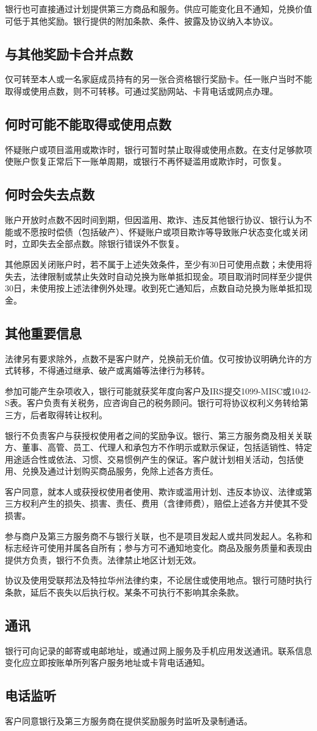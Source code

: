 \documentclass[UTF8,fontset=none,11pt,a4paper]{ctexart}
\begin{document}
银行也可直接通过计划提供第三方商品和服务。供应可能变化且不通知，兑换价值可低于其他奖励。银行提供的附加条款、条件、披露及协议纳入本协议。


\subsection*{与其他奖励卡合并点数}
仅可转至本人或一名家庭成员持有的另一张合资格银行奖励卡。任一账户当时不能取得或使用点数，则不可转移。可通过奖励网站、卡背电话或网点办理。


\subsection*{何时可能不能取得或使用点数}
怀疑账户或项目滥用或欺诈时，银行可暂时禁止取得或使用点数。在支付足够款项使账户恢复正常后下一账单周期，或银行不再怀疑滥用或欺诈时，可恢复。


\subsection*{何时会失去点数}
账户开放时点数不因时间到期，但因滥用、欺诈、违反其他银行协议、银行认为不能或不愿按时偿债（包括破产）、怀疑账户或项目欺诈等导致账户状态变化或关闭时，立即失去全部点数。除银行错误外不恢复。


其他原因关闭账户时，若不属于上述失效条件，至少有30日可使用点数；未使用将失去，法律限制或禁止失效时自动兑换为账单抵扣现金。项目取消时同样至少提供30日，未使用按上述法律例外处理。收到死亡通知后，点数自动兑换为账单抵扣现金。


\subsection*{其他重要信息}
法律另有要求除外，点数不是客户财产，兑换前无价值。仅可按协议明确允许的方式转移，不得通过继承、破产或离婚等法律行为移转。


参加可能产生杂项收入，银行可能就获奖年度向客户及IRS提交1099-MISC或1042-S表。客户负责有关税务，应咨询自己的税务顾问。银行可将协议权利义务转给第三方，后者取得转让权利。


银行不负责客户与获授权使用者之间的奖励争议。银行、第三方服务商及相关关联方、董事、高管、员工、代理人和承包方不作明示或默示保证，包括适销性、特定用途适合性或依法、习惯、交易惯例产生的保证。客户就计划相关活动，包括使用、兑换及通过计划购买商品服务，免除上述各方责任。


客户同意，就本人或获授权使用者使用、欺诈或滥用计划、违反本协议、法律或第三方权利产生的损失、损害、责任、费用（含律师费），赔偿上述各方并使其不受损害。


参与商户及第三方服务商不与银行关联，也不是项目发起人或共同发起人。名称和标志经许可使用并属各自所有；参与方可不通知地变化。商品及服务质量和表现由提供方负责，银行不负责。法律禁止地区计划无效。


协议及使用受联邦法及特拉华州法律约束，不论居住或使用地点。银行可随时执行条款，延后不丧失以后执行权。某条不可执行不影响其余条款。


\subsection*{通讯}
银行可向记录的邮寄或电邮地址，或通过网上服务及手机应用发送通讯。联系信息变化应立即按账单所列客户服务地址或卡背电话通知。


\subsection*{电话监听}
客户同意银行及第三方服务商在提供奖励服务时监听及录制通话。
\end{document}
